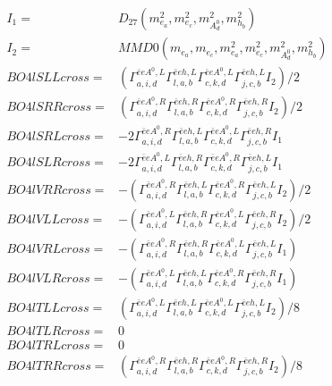 \documentclass[A4,landscape]{article}
\begin{document}
\begin{align} 
I_1 = & D_{27}(m^2_{e_{{a}}}, m^2_{e_{{c}}}, m^2_{A^0_{{d}}}, m^2_{h_{{b}}}) \\ 
I_2 = & MMD0(m_{e_{{a}}}, m_{e_{{c}}}, m^2_{e_{{a}}}, m^2_{e_{{c}}}, m^2_{A^0_{{d}}}, m^2_{h_{{b}}}) \\ 
  BO4lSLLcross= & ( \Gamma^{\bar{e}e A^0 ,L}_{a, i, d} \Gamma^{\bar{e}e h ,L}_{l, a, b} \Gamma^{\bar{e}e A^0 ,L}_{c, k, d} \Gamma^{\bar{e}e h ,L}_{j, c, b} I_2)/2 \\ 
  BO4lSRRcross= & ( \Gamma^{\bar{e}e A^0 ,R}_{a, i, d} \Gamma^{\bar{e}e h ,R}_{l, a, b} \Gamma^{\bar{e}e A^0 ,R}_{c, k, d} \Gamma^{\bar{e}e h ,R}_{j, c, b} I_2)/2 \\ 
  BO4lSRLcross= & -2  \Gamma^{\bar{e}e A^0 ,R}_{a, i, d} \Gamma^{\bar{e}e h ,L}_{l, a, b} \Gamma^{\bar{e}e A^0 ,L}_{c, k, d} \Gamma^{\bar{e}e h ,R}_{j, c, b} I_1 \\ 
  BO4lSLRcross= & -2  \Gamma^{\bar{e}e A^0 ,L}_{a, i, d} \Gamma^{\bar{e}e h ,R}_{l, a, b} \Gamma^{\bar{e}e A^0 ,R}_{c, k, d} \Gamma^{\bar{e}e h ,L}_{j, c, b} I_1 \\ 
  BO4lVRRcross= & -( \Gamma^{\bar{e}e A^0 ,R}_{a, i, d} \Gamma^{\bar{e}e h ,L}_{l, a, b} \Gamma^{\bar{e}e A^0 ,R}_{c, k, d} \Gamma^{\bar{e}e h ,L}_{j, c, b} I_2)/2 \\ 
  BO4lVLLcross= & -( \Gamma^{\bar{e}e A^0 ,L}_{a, i, d} \Gamma^{\bar{e}e h ,R}_{l, a, b} \Gamma^{\bar{e}e A^0 ,L}_{c, k, d} \Gamma^{\bar{e}e h ,R}_{j, c, b} I_2)/2 \\ 
  BO4lVRLcross= & -( \Gamma^{\bar{e}e A^0 ,R}_{a, i, d} \Gamma^{\bar{e}e h ,R}_{l, a, b} \Gamma^{\bar{e}e A^0 ,L}_{c, k, d} \Gamma^{\bar{e}e h ,L}_{j, c, b} I_1) \\ 
  BO4lVLRcross= & -( \Gamma^{\bar{e}e A^0 ,L}_{a, i, d} \Gamma^{\bar{e}e h ,L}_{l, a, b} \Gamma^{\bar{e}e A^0 ,R}_{c, k, d} \Gamma^{\bar{e}e h ,R}_{j, c, b} I_1) \\ 
  BO4lTLLcross= & ( \Gamma^{\bar{e}e A^0 ,L}_{a, i, d} \Gamma^{\bar{e}e h ,L}_{l, a, b} \Gamma^{\bar{e}e A^0 ,L}_{c, k, d} \Gamma^{\bar{e}e h ,L}_{j, c, b} I_2)/8 \\ 
  BO4lTLRcross= & 0 \\ 
  BO4lTRLcross= & 0 \\ 
  BO4lTRRcross= & ( \Gamma^{\bar{e}e A^0 ,R}_{a, i, d} \Gamma^{\bar{e}e h ,R}_{l, a, b} \Gamma^{\bar{e}e A^0 ,R}_{c, k, d} \Gamma^{\bar{e}e h ,R}_{j, c, b} I_2)/8 \\ 
\end{align} 
\end{document}
